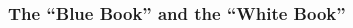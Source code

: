 \documentclass[svgnames, aspectratio=169]{beamer}
\begin{document}
\begin{frame}
  \frametitle{The ``Blue Book'' and the ``White Book''}

  \begin{columns}
    \begin{column}{2cm}

\end{column}
\end{columns}
\end{frame}
\end{document}
